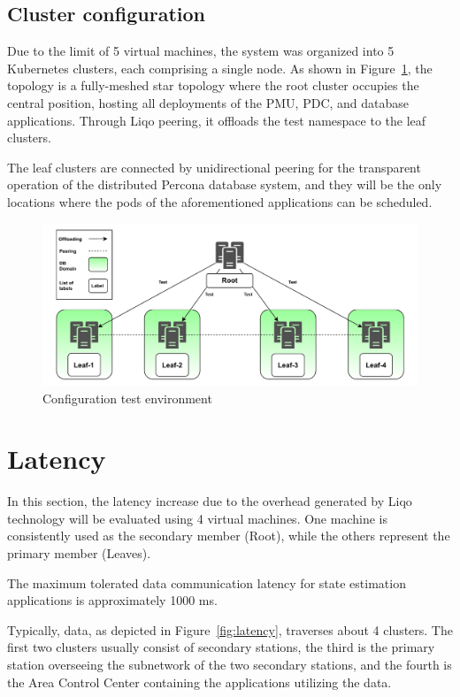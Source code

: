 \subsection{Cluster configuration}
Due to the limit of 5 virtual machines, the system was organized into 5 Kubernetes clusters, each comprising a single node. As shown in Figure~\ref{fig:test}, the topology is a fully-meshed star topology where the root cluster occupies the central position, hosting all deployments of the PMU, PDC, and database applications. Through Liqo peering, it offloads the test namespace to the leaf clusters.

The leaf clusters are connected by unidirectional peering for the transparent operation of the distributed Percona database system, and they will be the only locations where the pods of the aforementioned applications can be scheduled.

\begin{figure}[ht]\centering
\includegraphics[scale=0.5]{Pictures/test}
\caption{Configuration test environment}\label{fig:test}
\end{figure}

\section{Latency}
In this section, the latency increase due to the overhead generated by Liqo technology will be evaluated using 4 virtual machines. One machine is consistently used as the secondary member (Root), while the others represent the primary member (Leaves).

The maximum tolerated data communication latency for state estimation applications is approximately 1000 ms.

Typically, data, as depicted in Figure~\ref{fig:latency}, traverses about 4 clusters. The first two clusters usually consist of secondary stations, the third is the primary station overseeing the subnetwork of the two secondary stations, and the fourth is the Area Control Center containing the applications utilizing the data.

